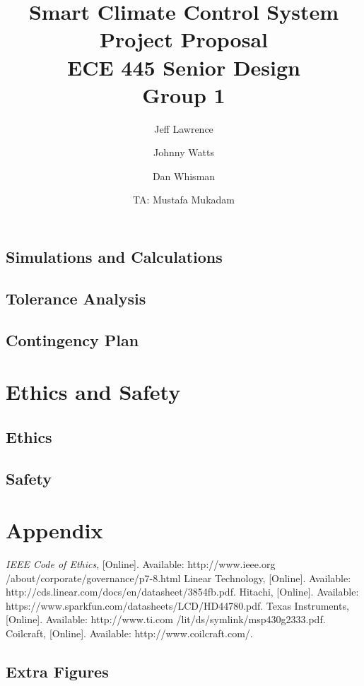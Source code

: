 \documentclass[draft,titlepage]{article}
\title{Smart Climate Control System\\ Project Proposal\\ ECE 445 Senior Design\\ Group 1}
\author{Jeff Lawrence
   \and Johnny Watts
   \and Dan Whisman
   \and TA: Mustafa Mukadam}
\begin{document}
\maketitle

\setcounter{secnumdepth}{5}

\tableofcontents







\subsection{Simulations and Calculations}




\subsection{Tolerance Analysis}



\subsection{Contingency Plan}

\section{Ethics and Safety}
\subsection{Ethics}
\subsection{Safety}

\section{Appendix}
\begin{thebibliography}{10}
	\textit{IEEE Code of Ethics}, [Online]. Available: http://www.ieee.org /about/corporate/governance/p7-8.html
	Linear Technology, [Online]. Available: http://cds.linear.com/docs/en/datasheet/3854fb.pdf.
	Hitachi, [Online]. Available: https://www.sparkfun.com/datasheets/LCD/HD44780.pdf.
	Texas Instruments, [Online]. Available: http://www.ti.com /lit/ds/symlink/msp430g2333.pdf.
	Coilcraft, [Online]. Available: http://www.coilcraft.com/.

\end{thebibliography}
\subsection{Extra Figures}
\end{document}
